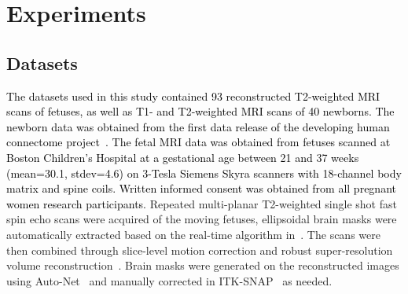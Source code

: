 \documentclass[journal,transmag]{IEEEtran}
\begin{document}



\section{Experiments}
\label{sec:results}
\subsection{Datasets}
\label{sec:datasets}
\textcolor{black}{The datasets used in this study contained 93 reconstructed T2-weighted MRI scans of fetuses, as well as T1- and T2-weighted MRI scans of 40 newborns. The newborn data was obtained from the first data release of the developing human connectome project~\cite{hughes2017developing}. The fetal MRI data was obtained from fetuses scanned at Boston Children's Hospital at a gestational age between 21 and 37 weeks (mean=30.1, stdev=4.6) on 3-Tesla Siemens Skyra scanners with 18-channel body matrix and spine coils. Written informed consent was obtained from all pregnant women research participants.} Repeated multi-planar T2-weighted single shot fast spin echo scans were acquired of the moving fetuses, ellipsoidal brain masks were automatically extracted based on the real-time algorithm in~\cite{salehi2018real}. The scans were then combined through slice-level motion correction and robust super-resolution volume reconstruction~\cite{gholipour2010robust,kainz2015fast}. Brain masks were generated on the reconstructed images using Auto-Net~\cite{salehi2017auto} and manually corrected in ITK-SNAP~\cite{yushkevich2006user} as needed.
\end{document}
